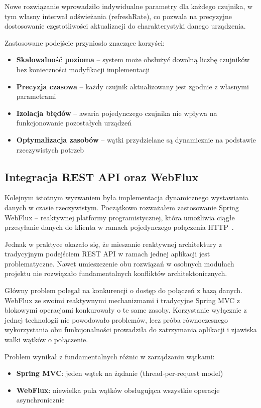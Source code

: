 \documentclass[a4paper,12pt,openany]{book}
\begin{document}
Nowe rozwiązanie wprowadziło indywidualne parametry dla każdego czujnika, w tym własny interwał odświeżania (refreshRate), co pozwala na precyzyjne dostosowanie częstotliwości aktualizacji do charakterystyki danego urządzenia.

Zastosowane podejście przyniosło znaczące korzyści:
\begin{itemize}
    \item \textbf{Skalowalność pozioma} -- system może obsłużyć dowolną liczbę czujników bez konieczności modyfikacji implementacji
    \item \textbf{Precyzja czasowa} -- każdy czujnik aktualizowany jest zgodnie z własnymi parametrami
    \item \textbf{Izolacja błędów} -- awaria pojedynczego czujnika nie wpływa na funkcjonowanie pozostałych urządzeń
    \item \textbf{Optymalizacja zasobów} -- wątki przydzielane są dynamicznie na podstawie rzeczywistych potrzeb
\end{itemize}

\subsection*{Integracja REST API oraz WebFlux}

Kolejnym istotnym wyzwaniem była implementacja dynamicznego wystawiania danych w czasie rzeczywistym. Początkowo rozważałem zastosowanie Spring WebFlux -- reaktywnej platformy programistycznej, która umożliwia ciągłe przesyłanie danych do klienta w ramach pojedynczego połączenia HTTP~\cite{bib:baeldung2023webflux}.

Jednak w praktyce okazało się, że mieszanie reaktywnej architektury z tradycyjnym podejściem REST API w ramach jednej aplikacji jest problematyczne. Nawet umieszczenie obu rozwiązań w osobnych modułach projektu nie rozwiązało fundamentalnych konfliktów architektonicznych.

Główny problem polegał na konkurencji o dostęp do połączeń z bazą danych. WebFlux ze swoimi reaktywnymi mechanizmami i tradycyjne Spring MVC z blokowymi operacjami konkurowały o te same zasoby. Korzystanie wyłącznie z jednej technologii nie powodowało problemów, lecz próba równoczesnego wykorzystania obu funkcjonalności prowadziła do zatrzymania aplikacji i zjawiska walki wątków o połączenie.

Problem wynikał z fundamentalnych różnic w zarządzaniu wątkami:
\begin{itemize}
   \item \textbf{Spring MVC}: jeden wątek na żądanie (thread-per-request model)
   \item \textbf{WebFlux}: niewielka pula wątków obsługująca wszystkie operacje asynchronicznie
\end{itemize}
\end{document}
